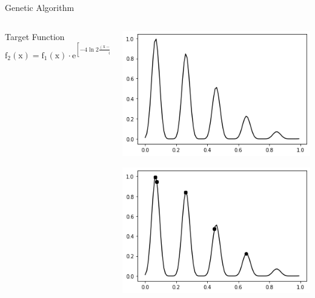 \documentclass{beamer}
\begin{document}
\begin{frame}{Genetic Algorithm}
    \begin{columns}[c]
    \begin{column}{0.5\textwidth}
        Target Function
        \begin{equation}
        \mathrm{f}_{2}(\mathrm{x})=\mathrm{f}_{1}(\mathrm{x}) \cdot
        \mathrm{e}^{\left[-4 \ln 2
        \frac{(\mathrm{x}-0.086)^{2}}{0.8^{2}}\right]}
        \end{equation}
    \end{column}
    \begin{column}{0.5\textwidth}
        \begin{center}
              \includegraphics[width=0.8\linewidth]{GA_images/example-composite-sin.png}
        \end{center}
        \begin{center}
      \includegraphics[width=\linewidth]{GA_images/example-composite-sin-result.png}
        \end{center}
    \end{column}
\end{columns}
\end{frame}
\end{document}
